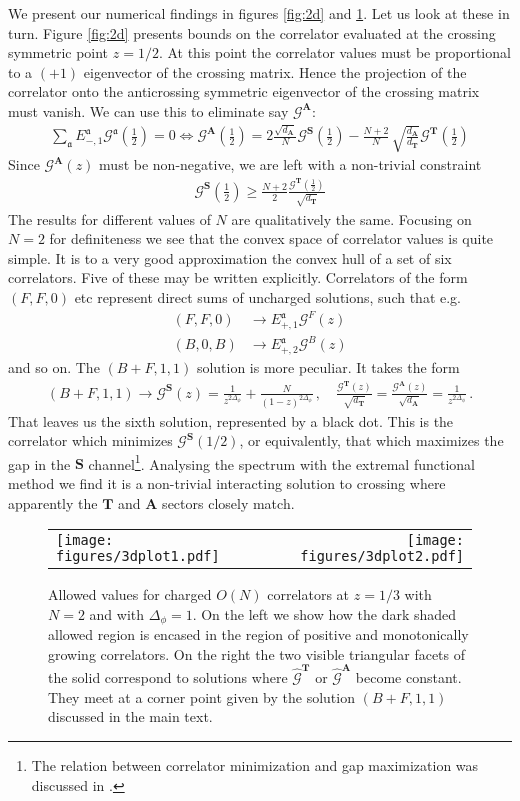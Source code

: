 \documentclass[12pt]{article}
\numberwithin{equation}{section}
\newcommand{\bea}{\begin{eqnarray}}
\newcommand{\eea}{\end{eqnarray}}
\newcommand{\ba}{\begin{equation}\begin{aligned}}
\newcommand{\ea}{\end{aligned}\end{equation}}
\newcommand{\mbf}{\mathbf}
\newcommand{\Df}{{\Delta_\phi}}
\newcommand{\mf}[1]{\mathfrak #1}
\begin{document}
	We present our numerical findings in figures \ref{fig:2d} and \ref{fig:3d}. Let us look at these in turn. Figure \ref{fig:2d} presents bounds on the correlator evaluated at the crossing symmetric point $z=1/2$. At this point the correlator values must be proportional to a $(+1)$ eigenvector of the crossing matrix. Hence the projection of the correlator onto the anticrossing symmetric eigenvector of the crossing matrix must vanish. We can use this to eliminate say $\mathcal G^{\mbf A}$:
	\ba
	\sum_{\mf a} E_{-,1}^{\mf a}\mathcal G^{\mf a}(\mbox{$\frac 12$})=0 \Leftrightarrow 
	\mathcal G^{\mbf A}(\mbox{$\frac 12$})=2\frac{\sqrt{d_{\mbf A}}}N \mathcal G^{\mbf S}(\mbox{$\frac 12$})-\frac{N+2}N\,\sqrt{\frac{d_{\mbf A}}{d_{\mbf T}}} \mathcal G^{\mbf T}(\mbox{$\frac 12$})
	\ea
	Since $\mathcal G^{\mbf A}(z)$ must be non-negative, we are left with a non-trivial constraint
	\bea
	\mathcal G^{\mbf S}(\mbox{$\frac 12$})\geq \frac{N+2}2 \frac{\mathcal G^{\mbf T}(\mbox{$\frac 12$})}{\sqrt{d_{\mbf T}}}
	\eea
	The results for different values of $N$ are qualitatively the same. Focusing on $N=2$ for definiteness we see that the convex space of correlator values is quite simple. It is to a very good approximation the convex hull of a set of six correlators. Five of these may be written explicitly. Correlators of the form $(F,F,0)$ etc represent direct sums of uncharged solutions, such that e.g.
	\ba
	(F,F,0)&\to   E_{+,1}^{\mf a} \mathcal G^F(z)\\
	(B,0,B)&\to   E_{+,2}^{\mf a} \mathcal G^B(z)
	\ea
	and so on. The $(B+F,1,1)$ solution is more peculiar. It takes the form
	\bea
	(B+F,1,1) \to \mathcal G^{\mbf S}(z)=\frac{1}{z^{2\Df}}+\frac{N}{(1-z)^{2\Df}}\,, \quad \frac{\mathcal G^{\mbf T}(z)}{\sqrt{d_{\mbf T}}}=\frac{\mathcal G^{\mbf A}(z)}{\sqrt{d_{\mbf A}}}=\frac {1}{z^{2\Df}}\,.
	\eea
	That leaves us the sixth solution, represented by a black dot. This is the correlator which minimizes $\mathcal G^{\mbf S}(1/2)$, or equivalently, that which maximizes the gap in the $\mbf S$ channel\footnote{The relation between correlator minimization and gap maximization was discussed in \cite{Paulos:2020zxx}.}. Analysing the spectrum with the extremal functional method \cite{El-Showk:2016mxr} we find it is a non-trivial interacting solution to crossing where apparently the $\mbf T$ and $\mbf A$ sectors closely match.
	
    
		\begin{figure}
		\centering
		\begin{tabular}{lr}
			\texttt{[image: figures/3dplot1.pdf]}	&
			\texttt{[image: figures/3dplot2.pdf]}
		\end{tabular}
		\caption{\label{fig:3d}Allowed values for charged $O(N)$ correlators at $z=1/3$ with $N=2$ and with $\Df=1$. On the left we show how the dark shaded allowed region is encased in the region of positive and monotonically growing correlators. On the right the two visible triangular facets of the solid correspond to solutions where $\hat {\mathcal G}^{\mbf T}$ or $\hat{ \mathcal G}^{\mbf A}$ become constant. They meet at a corner point given by the solution $(B+F,1,1)$ discussed in the main text.
		}
	\end{figure}
\end{document}
